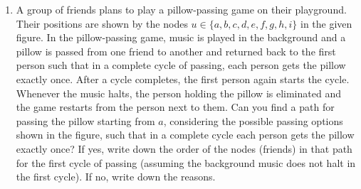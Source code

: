 \documentclass[12pt,a3paper]{article}
\begin{document}
\begin{enumerate}
\item A group of friends plans to play a pillow-passing game on their playground. Their positions are shown by the nodes $u \in \{a,b,c,d,e,f,g,h,i\}$ in the given figure. In the pillow-passing game, music is played in the background and a pillow is passed from one friend to another and returned back to the first person such that in a complete cycle of passing, each person gets the pillow exactly once. After a cycle completes, the first person again starts the cycle. Whenever the music halts, the person holding the pillow is eliminated and the game restarts from the person next to them. Can you find a path for passing the pillow starting from $a$, considering the possible passing options shown in the figure, such that in a complete cycle each person gets the pillow exactly once? If yes, write down the order of the nodes (friends) in that path for the first cycle of passing (assuming the background music does not halt in the first cycle). If no, write down the reasons.

\begin{center}
\end{center}
\end{enumerate}
\end{document}
